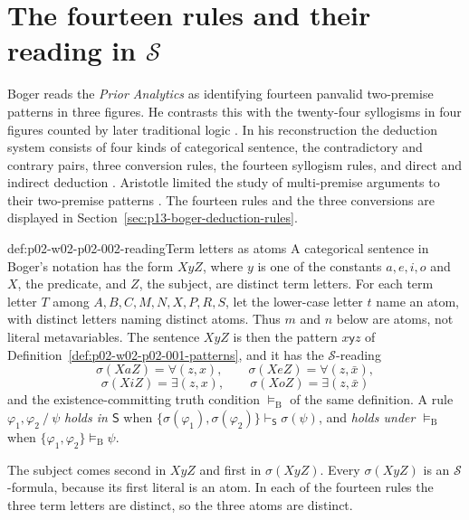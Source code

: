 \section{The fourteen rules and their reading in \texorpdfstring{\(\mathcal S\)}{S}}
\label{sec:p02-w02-p02-002-reading}

Boger reads the \emph{Prior Analytics} as identifying fourteen panvalid
two-premise patterns in three figures. He contrasts this with the
twenty-four syllogisms in four figures counted by later traditional logic
\cite[p.~184 and note~75]{Boger2004UnderlyingLogic}. In his reconstruction
the deduction system consists of four kinds of categorical sentence, the
contradictory and contrary pairs, three conversion rules, the fourteen
syllogism rules, and direct and indirect deduction
\cite[p.~166, table~10]{Boger2004UnderlyingLogic}. Aristotle limited the
study of multi-premise arguments to their two-premise patterns
\cite[p.~166]{Boger2004UnderlyingLogic}. The fourteen rules and the three
conversions are displayed in Section~\ref{sec:p13-boger-deduction-rules}.

\begin{hbconvention}{def:p02-w02-p02-002-reading}{Term letters as atoms}
A categorical sentence in Boger's notation has the form \(XyZ\), where
\(y\) is one of the constants \(a,e,i,o\) and \(X\), the predicate, and
\(Z\), the subject, are distinct term letters. For each term letter \(T\)
among \(A,B,C,M,N,X,P,R,S\), let the lower-case letter \(t\) name an atom,
with distinct letters naming distinct atoms. Thus \(m\) and \(n\) below are
atoms, not literal metavariables. The sentence \(XyZ\) is then the pattern
\(x\mathbin{\mathsf y}z\) of Definition~\ref{def:p02-w02-p02-001-patterns},
and it has the \(\mathcal S\)-reading
\[
 \sigma(XaZ)=\forall(z,x),\qquad
 \sigma(XeZ)=\forall(z,\bar x),
\]
\[
 \sigma(XiZ)=\exists(z,x),\qquad
 \sigma(XoZ)=\exists(z,\bar x)
\]
and the existence-committing truth condition \(\models_{\mathrm B}\) of the
same definition. A rule \(\varphi_1,\varphi_2\mathbin{/}\psi\) \emph{holds in
\(\mathsf S\)} when
\(\{\sigma(\varphi_1),\sigma(\varphi_2)\}\vdash_{\mathsf S}\sigma(\psi)\), and
\emph{holds under \(\models_{\mathrm B}\)} when
\(\{\varphi_1,\varphi_2\}\models_{\mathrm B}\psi\).
\end{hbconvention}

The subject comes second in \(XyZ\) and first in \(\sigma(XyZ)\). Every
\(\sigma(XyZ)\) is an \(\mathcal S\)-formula, because its first literal is an
atom. In each of the fourteen rules the three term letters are distinct, so
the three atoms are distinct.

